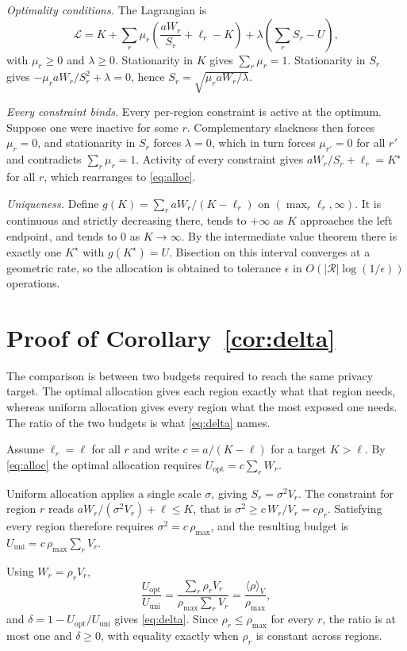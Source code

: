 \documentclass[acmsmall,screen,review,anonymous]{acmart}
\theoremstyle{acmdefinition}%
\newcommand{\Reg}{\mathcal{R}}
\begin{document}
\emph{Optimality conditions.} The Lagrangian is
\begin{equation}
\mathcal{L} = K + \sum_r \mu_r \left( \frac{a W_r}{S_r} + \ell_r - K \right)
+ \lambda \left( \sum_r S_r - U \right),
\end{equation}
with $\mu_r \ge 0$ and $\lambda \ge 0$. Stationarity in $K$ gives $\sum_r \mu_r =
1$. Stationarity in $S_r$ gives $-\mu_r a W_r / S_r^2 + \lambda = 0$, hence $S_r =
\sqrt{\mu_r a W_r / \lambda}$.

\emph{Every constraint binds.} Every per-region constraint is active at the optimum. Suppose one were inactive
for some $r$. Complementary slackness then forces $\mu_r = 0$, and stationarity in
$S_r$ forces $\lambda = 0$, which in turn forces $\mu_{r'} = 0$ for all $r'$ and
contradicts $\sum_r \mu_r = 1$. Activity of every constraint gives $a W_r / S_r +
\ell_r = K^{\star}$ for all $r$, which rearranges to \eqref{eq:alloc}.

\emph{Uniqueness.} Define $g(K) = \sum_r a W_r / (K - \ell_r)$ on $(\max_r \ell_r,
\infty)$. It is continuous and strictly decreasing there, tends to $+\infty$ as
$K$ approaches the left endpoint, and tends to $0$ as $K \to \infty$. By the
intermediate value theorem there is exactly one $K^{\star}$ with $g(K^{\star}) =
U$. Bisection on this interval converges at a geometric rate, so the allocation is
obtained to tolerance $\epsilon$ in $O(|\Reg| \log(1/\epsilon))$ operations.

\section{Proof of Corollary~\ref{cor:delta}}
\label{app:delta}

The comparison is between two budgets required to reach the same privacy target.
The optimal allocation gives each region exactly what that region needs, whereas
uniform allocation gives every region what the most exposed one needs. The ratio of
the two budgets is what \eqref{eq:delta} names.

Assume $\ell_r = \ell$ for all $r$ and write $c = a / (K - \ell)$ for a target $K
> \ell$. By \eqref{eq:alloc} the optimal allocation requires $U_{\mathrm{opt}} = c
\sum_r W_r$.

Uniform allocation applies a single scale $\sigma$, giving $S_r = \sigma^2 V_r$.
The constraint for region $r$ reads $a W_r / (\sigma^2 V_r) + \ell \le K$, that is
$\sigma^2 \ge c \, W_r / V_r = c \rho_r$. Satisfying every region therefore
requires $\sigma^2 = c \, \rho_{\max}$, and the resulting budget is
$U_{\mathrm{uni}} = c \, \rho_{\max} \sum_r V_r$.

Using $W_r = \rho_r V_r$,
\begin{equation}
\frac{U_{\mathrm{opt}}}{U_{\mathrm{uni}}}
= \frac{\sum_r \rho_r V_r}{\rho_{\max} \sum_r V_r}
= \frac{\langle \rho \rangle_V}{\rho_{\max}},
\end{equation}
and $\delta = 1 - U_{\mathrm{opt}} / U_{\mathrm{uni}}$ gives \eqref{eq:delta}.
Since $\rho_r \le \rho_{\max}$ for every $r$, the ratio is at most one and $\delta
\ge 0$, with equality exactly when $\rho_r$ is constant across regions.
\end{document}
